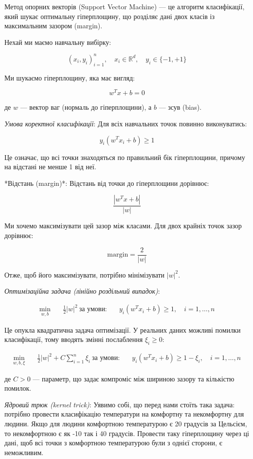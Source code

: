 Метод опорних векторів (Support Vector Machine) — це алгоритм класифікації, який шукає оптимальну гіперплощину, що розділяє дані двох класів із максимальним зазором (margin).

Нехай ми маємо навчальну вибірку:

$${(x_i, y_i)}_{i=1}^n, \quad x_i \in \mathbb{R}^d, \quad y_i \in \{-1, +1\}$$

Ми шукаємо гіперплощину, яка має вигляд:

$$w^T x + b = 0$$

де $w$ — вектор ваг (нормаль до гіперплощини), а $b$ — зсув (bias).


\textit{Умова коректної класифікації}: Для всіх навчальних точок повинно виконуватись:

$$y_i (w^T x_i + b) \ge 1$$

Це означає, що всі точки знаходяться по правильний бік гіперплощини, причому на відстані не менше 1 від неї.

*Відстань (margin)*: Відстань від точки до гіперплощини дорівнює:

$$
\frac{|w^T x + b|}{|w|}
$$

Ми хочемо максимізувати цей зазор між класами.
Для двох крайніх точок зазор дорівнює:

$$
\text{margin} = \frac{2}{|w|}
$$

Отже, щоб його максимізувати, потрібно мінімізувати $|w|^2$.


\textit{Оптимізаційна задача (лінійно роздільний випадок)}:

$$
\begin{aligned}
\min_{w, b} \quad & \frac{1}{2}|w|^2 \
\text{за умови:} \quad & y_i (w^T x_i + b) \ge 1, \quad i = 1, \dots, n
\end{aligned}
$$

Це опукла квадратична задача оптимізації. У реальних даних можливі помилки класифікації, тому вводять змінні послаблення $\xi_i \ge 0$:

$$
\begin{aligned}
\min_{w, b, \xi} \quad & \frac{1}{2}|w|^2 + C \sum_{i=1}^n \xi_i \
\text{за умови:} \quad & y_i (w^T x_i + b) \ge 1 - \xi_i, \quad i = 1, \dots, n
\end{aligned}
$$

де $C > 0$ — параметр, що задає компроміс між шириною зазору та кількістю помилок.


\textit{Ядровий трюк (kernel trick)}: Уявимо собі, що перед нами стоїть така задача: потрібно провести класифікацію температури на комфортну та некомфортну для людини. Якщо для людини комфортною температурою є 20 градусів за Цельсієм, то некомфортною є як -10 так і 40 градусів. Провести таку гіперплощину через ці дані, щоб всі точки з комфортною температурою були з однієї сторони, є неможливим. 

